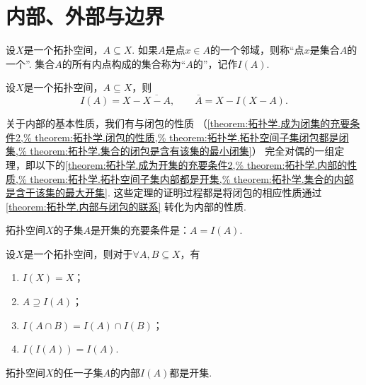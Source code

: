\section{内部、外部与边界}
\begin{definition}\label{definition:拓扑学.内部的概念}
设\(X\)是一个拓扑空间，\(A \subseteq X\).
如果\(A\)是点\(x \in A\)的一个邻域，则称“点\(x\)是集合\(A\)的一个”.
集合\(A\)的所有内点构成的集合称为“\(A\)的”，记作\(I(A)\).
\end{definition}

\begin{theorem}\label{theorem:拓扑学.内部与闭包的联系}
设\(X\)是一个拓扑空间，\(A \subseteq X\)，则\[
I(A) = X - \overline{X - A}, \qquad
\overline{A} = X - I(X - A).
\]
\end{theorem}

关于内部的基本性质，我们有与闭包的性质
（\cref{theorem:拓扑学.成为闭集的充要条件2,%
theorem:拓扑学.闭包的性质,%
theorem:拓扑学.拓扑空间子集闭包都是闭集,%
theorem:拓扑学.集合的闭包是含有该集的最小闭集}）
完全对偶的一组定理，即以下的\cref{theorem:拓扑学.成为开集的充要条件2,%
theorem:拓扑学.内部的性质,%
theorem:拓扑学.拓扑空间子集内部都是开集,%
theorem:拓扑学.集合的内部是含于该集的最大开集}.
这些定理的证明过程都是将闭包的相应性质通过\cref{theorem:拓扑学.内部与闭包的联系}
转化为内部的性质.

\begin{theorem}\label{theorem:拓扑学.成为开集的充要条件2}
拓扑空间\(X\)的子集\(A\)是开集的充要条件是：\(A = I(A)\).
\end{theorem}

\begin{theorem}\label{theorem:拓扑学.内部的性质}
设\(X\)是一个拓扑空间，则对于\(\forall A,B \subseteq X\)，有
\begin{enumerate}
	\item \(I(X) = X\)；
	\item \(A \supseteq I(A)\)；
	\item \(I(A \cap B) = I(A) \cap I(B)\)；
	\item \(I(I(A)) = I(A)\).
\end{enumerate}
\end{theorem}

\begin{theorem}\label{theorem:拓扑学.拓扑空间子集内部都是开集}
拓扑空间\(X\)的任一子集\(A\)的内部\(I(A)\)都是开集.
\end{theorem}


